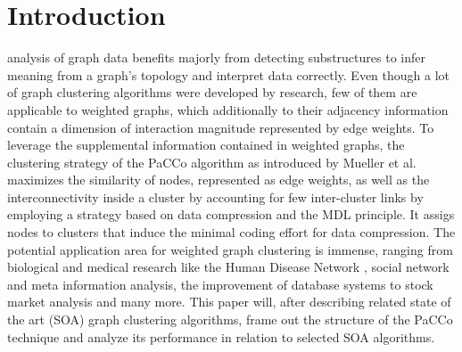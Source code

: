 \documentclass[12pt,journal,compsoc]{IEEEtran}
\numberwithin{equation}{section}
\begin{document}
\maketitle

\IEEEdisplaynotcompsoctitleabstractindextext


%
\IEEEpeerreviewmaketitle



\section{Introduction}
 analysis of graph data benefits majorly from detecting substructures to infer meaning from a graph's topology and interpret data correctly. Even though a lot of graph clustering algorithms were developed by research, few of them are applicable to weighted graphs, which additionally to their adjacency information contain a dimension of interaction magnitude represented by edge weights.  
To leverage the supplemental information contained in weighted graphs, the clustering strategy of the PaCCo algorithm as introduced by Mueller et al. \cite{mueller2011weighted} maximizes the similarity of nodes, represented as edge weights, as well as the interconnectivity inside a cluster by accounting for few inter-cluster links by employing a strategy based on data compression and the MDL principle. It assigs nodes to clusters that induce the minimal coding effort for data compression.
The potential application area for weighted graph clustering is immense, ranging from biological and medical research like the Human Disease Network \cite{HDN2007}, social network and meta information analysis, the improvement of database systems to stock market analysis and many more.
This paper will, after describing related state of the art (SOA) graph clustering algorithms, frame out the structure of the PaCCo technique and analyze its performance in relation to selected SOA algorithms.
\end{document}

